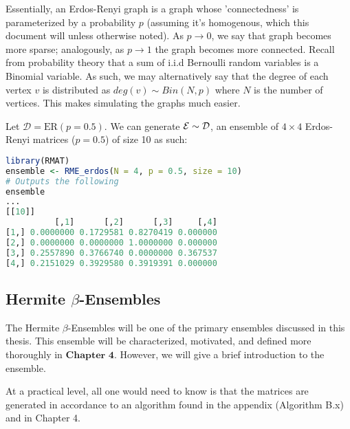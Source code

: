 Essentially, an Erdos-Renyi graph is a graph whose 'connectedness' is parameterized by a probability $p$ (assuming it's homogenous, which this document will unless otherwise noted). As $p \to 0$, we say that graph becomes more sparse; analogously, as $p \to 1$ the graph becomes more connected.\newline
\indent Recall from probability theory that a sum of i.i.d Bernoulli random variables is a Binomial variable. As such, we may alternatively say that the degree of each vertex $v$ is distributed as $deg(v) \sim Bin(N,p)$ where $N$ is the number of vertices. This makes simulating the graphs much easier.

\begin{code}[Erdos-Renyi p = 0.5 Ensemble]
Let $\mathcal{D} = \text{ER}(p = 0.5)$. We can generate $\mathcal{E} \sim \mathcal{D}$, an ensemble of $4 \times 4$ Erdos-Renyi matrices ($p = 0.5$) of size 10 as such:
\end{code}

\begin{lstlisting}[language=R]
library(RMAT)
ensemble <- RME_erdos(N = 4, p = 0.5, size = 10)
# Outputs the following
ensemble
...
[[10]]
          [,1]      [,2]      [,3]     [,4]
[1,] 0.0000000 0.1729581 0.8270419 0.000000
[2,] 0.0000000 0.0000000 1.0000000 0.000000
[3,] 0.2557890 0.3766740 0.0000000 0.367537
[4,] 0.2151029 0.3929580 0.3919391 0.000000
\end{lstlisting}


\subsection{Hermite $\beta$-Ensembles}

The Hermite $\beta$-Ensembles will be one of the primary ensembles discussed in this thesis. This ensemble will be characterized, motivated, and defined more thoroughly in $\textbf{Chapter 4}$. However, we will give a brief introduction to the ensemble.

At a practical level, all one would need to know is that the matrices are generated in accordance to an algorithm found in the appendix (Algorithm B.x) and in Chapter 4.


